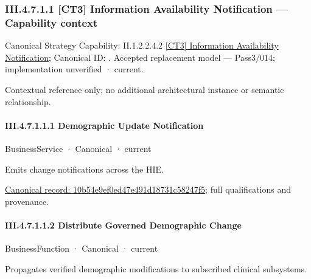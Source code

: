 \subsubsection*{III.4.7.1.1 [CT3] Information Availability Notification — Capability context}
\label{navigation:III.4.7.1.1}

{\small Canonical Strategy Capability: II.1.2.2.4.2 \hyperref[element:c159dcc35e0f43418af6c6176e271ca7]{[CT3] Information Availability Notification}; Canonical ID: \texttt{}. Accepted replacement model — Pass3/014; implementation unverified · current.}\par
Contextual reference only; no additional architectural instance or semantic relationship.\par
\paragraph*{III.4.7.1.1.1 Demographic Update Notification}
\label{navigation:III.4.7.1.1.1}

\label{element:10b54e9ef0ed47e491d18731c58247f5}
{\small BusinessService · Canonical · current}\par

Emits change notifications across the HIE.


{\footnotesize \href{../../../../../../../../continuum/business/business-service/10b54e9ef0ed47e491d18731c58247f5.md}{Canonical record: 10b54e9ef0ed47e491d18731c58247f5}; full qualifications and provenance.}\par
\paragraph*{III.4.7.1.1.2 Distribute Governed Demographic Change}
\label{navigation:III.4.7.1.1.2}

\label{element:61a4ae56602c4e2d9428169188e458d8}
{\small BusinessFunction · Canonical · current}\par

Propagates verified demographic modifications to subscribed clinical subsystems.



